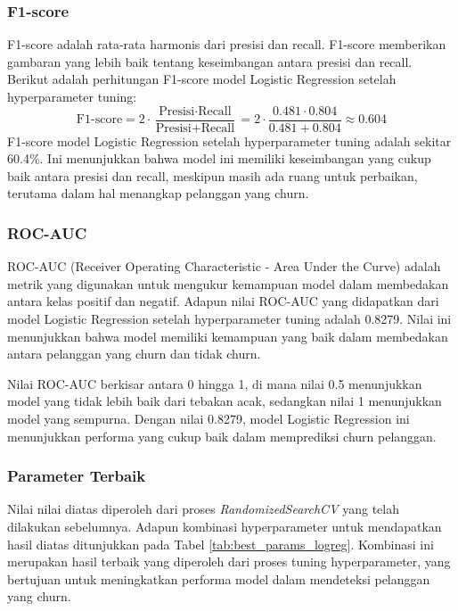 \subsubsection*{F1-score}
F1-score adalah rata-rata harmonis dari presisi dan recall. F1-score memberikan gambaran yang lebih baik tentang keseimbangan antara presisi dan recall. Berikut adalah perhitungan F1-score model Logistic Regression setelah hyperparameter tuning:
\begin{equation}
    \text{F1-score} = 2 \cdot \frac{\text{Presisi} \cdot \text{Recall}}{\text{Presisi} + \text{Recall}} = 2 \cdot \frac{0.481 \cdot 0.804}{0.481 + 0.804} \approx 0.604
\end{equation}
F1-score model Logistic Regression setelah hyperparameter tuning adalah sekitar 60.4\%. Ini menunjukkan bahwa model ini memiliki keseimbangan yang cukup baik antara presisi dan recall, meskipun masih ada ruang untuk perbaikan, terutama dalam hal menangkap pelanggan yang churn.

\subsubsection*{ROC-AUC}
ROC-AUC (Receiver Operating Characteristic - Area Under the Curve) adalah metrik yang digunakan untuk mengukur kemampuan model dalam membedakan antara kelas positif dan negatif. Adapun nilai ROC-AUC yang didapatkan dari model Logistic Regression setelah hyperparameter tuning adalah 0.8279. Nilai ini menunjukkan bahwa model memiliki kemampuan yang baik dalam membedakan antara pelanggan yang churn dan tidak churn.

Nilai ROC-AUC berkisar antara 0 hingga 1, di mana nilai 0.5 menunjukkan model yang tidak lebih baik dari tebakan acak, sedangkan nilai 1 menunjukkan model yang sempurna. Dengan nilai 0.8279, model Logistic Regression ini menunjukkan performa yang cukup baik dalam memprediksi churn pelanggan.

\subsubsection{Parameter Terbaik}

Nilai nilai diatas diperoleh dari proses \textit{RandomizedSearchCV} yang telah dilakukan sebelumnya. Adapun kombinasi hyperparameter untuk mendapatkan hasil diatas ditunjukkan pada Tabel \ref{tab:best_params_logreg}. Kombinasi ini merupakan hasil terbaik yang diperoleh dari proses tuning hyperparameter, yang bertujuan untuk meningkatkan performa model dalam mendeteksi pelanggan yang churn.

